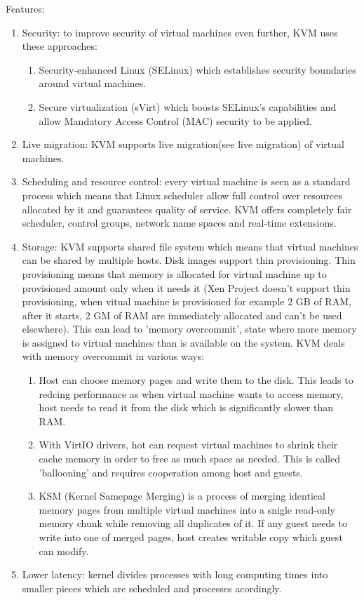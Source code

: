 Features:
\begin{enumerate}
\item Security: to improve security of virtual machines even further, KVM uses these approaches:
\begin{enumerate}
\item Security-enhanced Linux (SELinux) which establishes security boundaries around virtual machines.
\item Secure virtualization (sVirt) which boosts SELinux's capabilities and allow Mandatory Access Control (MAC) security to be applied.
\end{enumerate}
\item Live migration: KVM supports live migration(see live migration) of virtual machines.
\item Scheduling and resource control: every virtual machine is seen as a standard process which means that Linux scheduler allow full control over resources allocated by it and guarantees quality of service. KVM offers completely fair scheduler, control groups, network name spaces and real-time extensions.
\item Storage: KVM supports shared file system which means that virtual machines can be shared by multiple hosts. Disk images support thin provisioning. Thin provisioning means that memory is allocated for virtual machine up to provisioned amount only when it needs it (Xen Project doesn't support thin provisioning, when vitual machine is provisioned for example 2 GB of RAM, after it starts, 2 GM of RAM are immediately allocated and can't be used elsewhere). This can lead to 'memory overcommit', state where more memory is assigned to virtual machines than is available on the system. KVM deals with memory overcommit in various ways:
\begin{enumerate}
\item Host can choose memory pages and write them to the disk. This leads to redcing performance as when virtual machine wants to access memory, host needs to read it from the disk which is significantly slower than RAM.
\item With VirtIO drivers, hot can request virtual machines to shrink their cache memory in order to free as much space as needed. This is called 'ballooning' and requires cooperation among host and guests.
\item KSM (Kernel Samepage Merging) is a process of merging identical memory pages from multiple virtual machines into a snigle read-only memory chunk while removing all duplicates of it. If any guest needs to write into one of merged pages, host creates writable copy which guest can modify.
\end{enumerate}
\item Lower latency: kernel divides processes with long computing times into smaller pieces which are scheduled and processes acordingly.
\end{enumerate}


